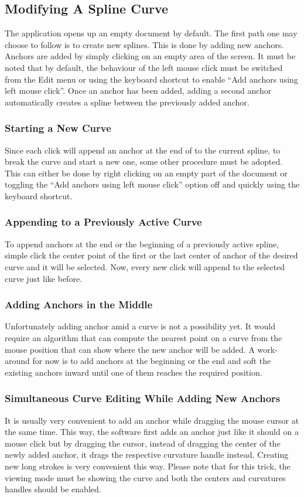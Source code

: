 \subsection{Modifying A Spline Curve}
{
    The application opens up an empty document by default. The first path one may choose to follow is to create new splines. This is done by adding new anchors. Anchors are added by simply clicking on an empty area of the screen. It must be noted that by default, the behaviour of the left mouse click must be switched from the Edit menu or using the keyboard shortcut to enable ``Add anchors using left mouse click''. Once an anchor has been added, adding a second anchor automatically creates a spline between the previously added anchor.
    \subsubsection{Starting a New Curve}
    {
        Since each click will append an anchor at the end of to the current spline, to break the curve and start a new one, some other procedure must be adopted. This can either be done by right clicking on an empty part of the document or toggling the ``Add anchors using left mouse click'' option off and quickly using the keyboard shortcut.
    }
    \subsubsection{Appending to a Previously Active Curve}
    {
        To append anchors at the end or the beginning of a previously active spline, simple click the center point of the first or the last center of anchor of the desired curve and it will be selected. Now, every new click will append to the selected curve just like before.
    }
    \subsubsection{Adding Anchors in the Middle}
    {
        Unfortunately adding anchor amid a curve is not a possibility yet. It would require an algorithm that can compute the nearest point on a curve from the mouse position that can show where the new anchor will be added. A work-around for now is to add anchors at the beginning or the end and soft the existing anchors inward until one of them reaches the required position.
    }
    \subsubsection{Simultaneous Curve Editing While Adding New Anchors}
    {
        It is usually very convenient to add an anchor while dragging the mouse cursor at the same time. This way, the software first adds an anchor just like it should on a mouse click but by dragging the cursor, instead of dragging the center of the newly added anchor, it drags the respective curvature handle instead. Creating new long strokes is very convenient this way. Please note that for this trick, the viewing mode must be showing the curve and both the centers and curvatures handles should be enabled.
    }
}
